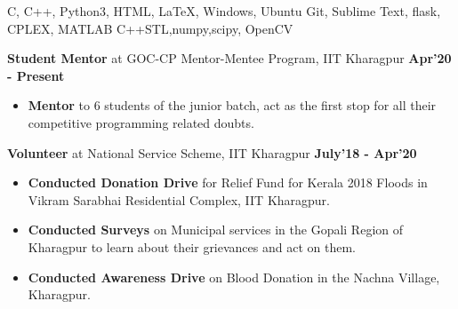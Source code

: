 \documentclass[10pt]{article}
\begin{document}
\vspace{-0.5ex}
\spacedhrule{0.15ex}{1.0ex}
\begingroup
    \fontsize{10pt}{12pt}\selectfont
    \vspace{-0.7ex}
	{C,\hspace{0.75ex} C++,\hspace{0.75ex} Python3,\hspace{0.75ex} HTML, \hspace{0.75ex}LaTeX,\hspace{0.75ex} Windows,\hspace{0.75ex} Ubuntu}
	\vspace{-0.7ex}
	{Git,\hspace{0.75ex} Sublime Text,\hspace{0.75ex} flask,\hspace{0.75ex} CPLEX,\hspace{0.75ex} MATLAB}
	\vspace{-0.7ex}
    {C++STL,\hspace{0.75ex}numpy,\hspace{0.75ex}scipy,\hspace{0.75ex} OpenCV}
\endgroup

\vspace{-0.3ex}
\spacedhrule{0.15ex}{2.0ex}
\vspace{-1ex}
\large { \textbf{Student Mentor} at GOC-CP Mentor-Mentee Program, IIT Kharagpur} \normalsize
{\hfill} \textbf{Apr'20 - Present}\\[-1.8em]
\begin{itemize}
    \item \textbf{Mentor} to 6 students of the junior batch, act as the first stop for all their competitive programming related doubts.
\end{itemize}
 \large { \textbf{Volunteer} at National Service Scheme, IIT Kharagpur} \normalsize
 {\hfill} \textbf{July'18 - Apr'20}\\[-1.8em]
 \begin{itemize}
     \item \textbf{Conducted  Donation Drive} for Relief Fund for Kerala 2018 Floods in Vikram Sarabhai Residential Complex, IIT Kharagpur.  \\[-2em]
    \item \textbf{Conducted Surveys} on Municipal services in the Gopali Region of Kharagpur to learn about their grievances and act on them.\\[-2em]
    \item \textbf{Conducted Awareness Drive} on Blood Donation in the Nachna Village, Kharagpur.\\[-1em]
 \end{itemize}
\end{document}
